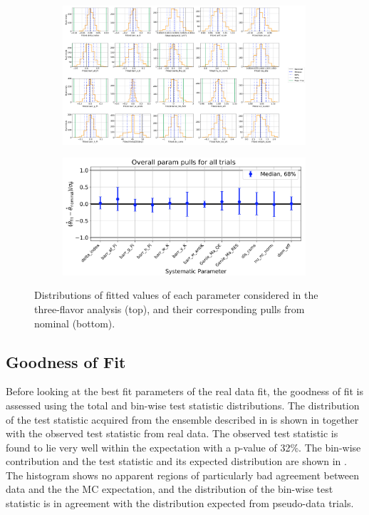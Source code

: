 \begin{figure} 
    \centering
    \begin{subfigure}[t]{0.99\textwidth}
        \centering
        \includegraphics[width=0.99\textwidth]{figures/measurement/three_flavor/ensemble_pre_fit/ensemble_fitdist.png}
    \end{subfigure}
    \begin{subfigure}[t]{0.65\textwidth}
        \centering
        \includegraphics[width=0.99\textwidth]{figures/measurement/three_flavor/ensemble_pre_fit/ensemble_pull.png}  
    \end{subfigure}
  \caption{Distributions of fitted values of each parameter considered in the three-flavor analysis (top), and their corresponding pulls from nominal (bottom).
  \label{fig:three-flavor-ensemble-param}}
\end{figure}


\subsection{Goodness of Fit}

Before looking at the best fit parameters of the real data fit, the goodness of fit is assessed using the total and bin-wise test statistic distributions. The distribution of the test statistic acquired from the ensemble described in  is shown in  together with the observed test statistic from real data. The observed test statistic is found to lie very well within the expectation with a p-value of 32\%. The bin-wise contribution and the test statistic and its expected distribution are shown in . The histogram shows no apparent regions of particularly bad agreement between data and the the MC expectation, and the distribution of the bin-wise test statistic is in agreement with the distribution expected from pseudo-data trials.


